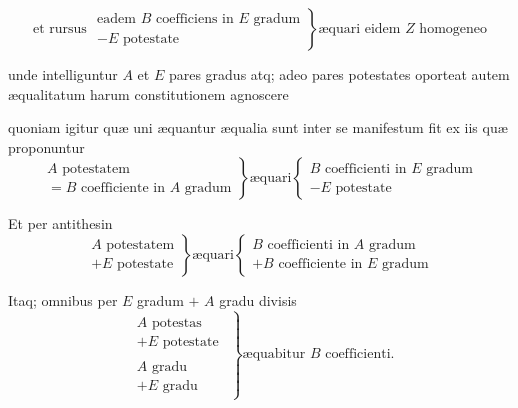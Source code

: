 \documentclass[11pt,a4paper]{article}
\begin{document}
\[ \text{et rursus } \left.\begin{array}{l} \text{eadem } B \text{ coefficiens in } E \text{ gradum} \\ - E \text{ potestate} \end{array}\right\} \text{æquari eidem } Z \text{ homogeneo} \]

unde intelliguntur $A$ et $E$ pares gradus atq; adeo pares potestates oporteat autem æqualitatum harum constitutionem agnoscere

quoniam igitur quæ uni æquantur æqualia sunt inter se manifestum fit ex iis quæ proponuntur
\[ \left.\begin{array}{l} A \text{ potestatem} \\ = B \text{ coefficiente in } A \text{ gradum} \end{array}\right\} \text{æquari} \left\{\begin{array}{l} B \text{ coefficienti in } E \text{ gradum} \\ - E \text{ potestate} \end{array}\right. \]

Et per antithesin
\[ \left.\begin{array}{l} A \text{ potestatem} \\ + E \text{ potestate} \end{array}\right\} \text{æquari} \left\{\begin{array}{l} B \text{ coefficienti in } A \text{ gradum} \\ + B \text{ coefficiente in } E \text{ gradum} \end{array}\right. \]

Itaq; omnibus per $E$ gradum $+$ $A$ gradu divisis
\[ \left.\begin{array}{c} \begin{array}{l} A \text{ potestas} \\ + E \text{ potestate} \end{array} \\ \hline \begin{array}{l} A \text{ gradu} \\ + E \text{ gradu} \end{array} \end{array}\right\} \text{æquabitur } B \text{ coefficienti.} \]

\end{document}
